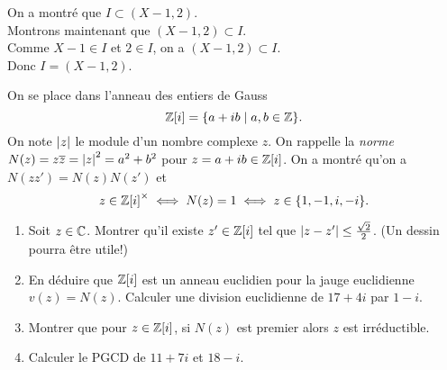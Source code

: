{\begin{td-sol}[]
\begin{enumerate}
            On a montré que \(I\subset (X-1,2)\).\\
            Montrons maintenant que \((X-1,2)\subset I\).\\
            Comme \(X-1\in I\) et \(2\in I\), on a \((X-1,2)\subset I\).\\
            Donc \(I = (X-1,2)\).

        \end{enumerate}
    \end{td-sol}
}{}

\begin{td-exo} %
    On se place dans l'anneau des entiers de Gauss
    \begin{equation*}
        \mathbb{Z}[i] = \{a+ib \mid a,b\in\mathbb{Z}\}.
    \end{equation*}
    On note \(\mathopen{}\left|z\right|\mathclose{}\) le module d'un nombre complexe \(z\). On
    rappelle la \emph{norme} \(N(z)=z\overline{z}={\mathopen{}\left|z\right|\mathclose{}}^2=a^2+b^2\)
    pour \(z=a+ib\in\mathbb{Z}[i]\). On a montré qu'on a 
    \(N(zz') = N(z)N(z')\) et
    \begin{equation*}
        z\in {\mathbb{Z}[i]}^\times \iff N(z) = 1 \iff z\in\{1,-1,i,-i\}.
    \end{equation*}
    \begin{enumerate}
        \item Soit \(z\in\mathbb{C}\). Montrer qu'il existe \(z'\in\mathbb{Z}[i]\)
        tel que \(\mathopen{}\left|z-z'\right|\mathclose{}\leq \frac{\sqrt{2}}{2}\). (Un dessin
        pourra être utile!)

        \item En déduire que \(\mathbb{Z}[i]\) est un anneau euclidien pour
        la jauge euclidienne \(v(z) = N(z)\).
        Calculer une division euclidienne de \(17+4i\) par \(1-i\).

        \item Montrer que pour \(z\in\mathbb{Z}[i]\), si \(N(z)\) est
        premier alors \(z\) est irréductible.

        \item Calculer le PGCD de \(11 + 7i\) et \(18 - i\).
    \end{enumerate}
\end{td-exo}

